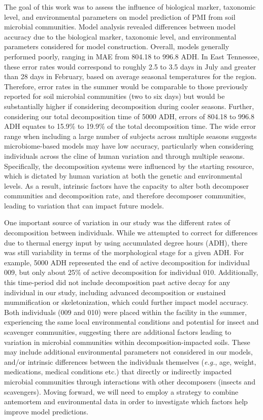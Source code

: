 \documentclass[
  10pt,
  letterpaper,
]{article}
\begin{document}
The goal of this work was to assess the influence of biological marker,
taxonomic level, and environmental parameters on model prediction of PMI
from soil microbial communities. Model analysis revealed differences
between model accuracy due to the biological marker, taxonomic level,
and environmental parameters considered for model construction. Overall,
models generally performed poorly, ranging in MAE from 804.18 to 996.8
ADH. In East Tennessee, these error rates would correspond to roughly
2.5 to 3.5 days in July and greater than 28 days in February, based on
average seasonal temperatures for the region. Therefore, error rates in
the summer would be comparable to those previously reported for soil
microbial communities (two to six days) \citep{belk_microbiome_2018} but
would be substantially higher if considering decomposition during cooler
seasons. Further, considering our total decomposition time of 5000 ADH,
errors of 804.18 to 996.8 ADH equates to 15.9\% to 19.9\% of the total
decomposition time. The wide error range when including a large number
of subjects across multiple seasons suggests microbiome-based models may
have low accuracy, particularly when considering individuals across the
cline of human variation and through multiple seasons. Specifically, the
decomposition systems were influenced by the starting resource, which is
dictated by human variation at both the genetic and environmental
levels. As a result, intrinsic factors have the capacity to alter both
decomposer communities and decomposition rate, and therefore decomposer
communities, leading to variation that can impact future models.

One important source of variation in our study was the different rates
of decomposition between individuals. While we attempted to correct for
differences due to thermal energy input by using accumulated degree
hours (ADH), there was still variability in terms of the morphological
stage for a given ADH. For example, 5000 ADH represented the end of
active decomposition for individual 009, but only about 25\% of active
decomposition for individual 010. Additionally, this time-period did not
include decomposition past active decay for any individual in our study,
including advanced decomposition or sustained mummification or
skeletonization, which could further impact model accuracy. Both
individuals (009 and 010) were placed within the facility in the summer,
experiencing the same local environmental conditions and potential for
insect and scavenger communities, suggesting there are additional
factors leading to variation in microbial communities within
decomposition-impacted soils. These may include additional environmental
parameters not considered in our models, and/or intrinsic differences
between the individuals themselves (\emph{e.g.}, age, weight,
medications, medical conditions etc.) that directly or indirectly
impacted microbial communities through interactions with other
decomposers (insects and scavengers). Moving forward, we will need to
employ a strategy to combine antemortem and environmental data in order
to investigate which factors help improve model predictions.
\end{document}
